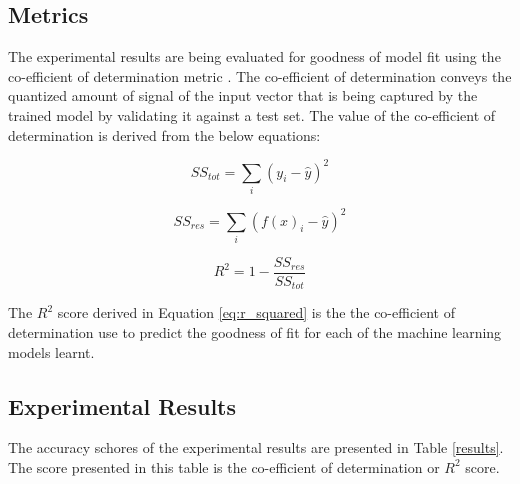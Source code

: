 \documentclass[conference]{IEEEtran}
\begin{document}
\subsection{Metrics}
The experimental results are being evaluated for goodness of model fit using the co-efficient of determination metric \cite{jaeger1990statistics}.
The co-efficient of determination conveys the quantized amount of signal of the input vector that is being captured by the trained model by validating it against a test set. 
The value of the co-efficient of determination is derived from the below equations:

\begin{equation}
\displaystyle SS_{tot} = \sum_{i} (y_i - \hat{y})^2
\end{equation}

\begin{equation}
\displaystyle SS_{res} = \sum_{i} (f(x)_i - \hat{y})^2
\end{equation}

\begin{equation} \label{eq:r_squared}
\displaystyle R^2 = 1 - \frac{SS_{res}}{SS_{tot}}
\end{equation}

The $R^2$ score derived in Equation \ref{eq:r_squared} is the the co-efficient of determination use to predict the goodness of fit for each of the machine learning models learnt.


\subsection{Experimental Results}

The accuracy schores of the experimental results are presented in Table \ref{results}. The score presented in this table is the co-efficient of determination or $R^2$ score.

\begin{table}[ht] \caption{Evaluation results} \label{results}
    \centering
\end{table}
\end{document}
